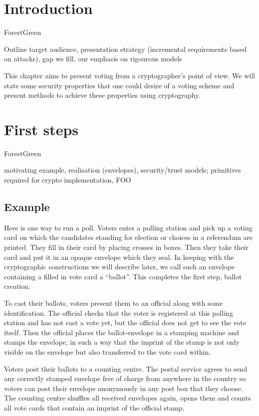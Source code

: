 \documentclass{llncs}
\newenvironment{structure}{
  \begin{color}{ForestGreen}
}{
  \end{color}
}
\begin{document}
\section{Introduction}

\begin{structure}
Outline target audience, presentation strategy (incremental requirements based on attacks), gap we fill, our emphasis on rigourous models
\end{structure}

This chapter aims to present voting from a cryptographer's point of view. We
will state some security properties that one could desire of a voting scheme and
present methods to achieve these properties using cryptography. 

\section{First steps}

\begin{structure}
motivating example, realisation (envelopes), security/trust models;
primitives required for crypto implementation, FOO
\end{structure}

\subsection{Example}

Here is one way to run a poll. Voters enter a polling station and pick up a voting card on which the candidates standing for election or choices in a referendum are printed. They fill in their card by placing crosses in boxes. Then they take their card and put it in an opaque envelope which they seal. In keeping with the cryptographic constructions we will describe later, we call such an envelope containing a filled in vote card a ``ballot''. This completes the first step, ballot creation.

To cast their ballots, voters present them to an official along with some identification. The official checks that the voter is registered at this polling station and has not cast a vote yet, but the official does not get to see the vote itself. Then the official places the ballot-envelope in a stamping machine and stamps the envelope, in such a way that the imprint of the stamp is not only visible on the envelope but also transferred to the vote card within.

Voters post their ballots to a counting centre. The postal service agrees to send any correctly stamped envelope free of charge from anywhere in the country so voters can post their envelope anonymously in any post box that they choose. 
The counting centre shuffles all received envelopes again, opens them and counts all vote cards that contain an imprint of the official stamp.
\end{document}
